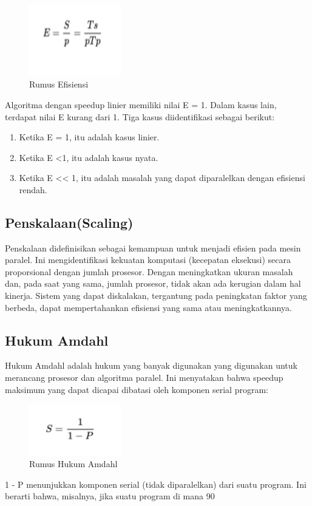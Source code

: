 \begin{figure}[H]
    \includegraphics[width=4cm]{figures/kelompok3/1/efisiensi.png}
    \centering
    \caption{Rumus Efisiensi}
\end{figure}
Algoritma dengan speedup linier memiliki nilai E = 1. Dalam kasus lain, terdapat nilai E kurang dari 1. 
\hfill\break
Tiga kasus diidentifikasi sebagai berikut:
\begin{enumerate}
	\item Ketika E = 1, itu adalah kasus linier.  
	\item Ketika E <1, itu adalah kasus nyata.  
	\item Ketika E << 1, itu adalah masalah yang dapat diparalelkan dengan efisiensi rendah.
\end{enumerate}
\subsection{Penskalaan(Scaling)}
Penskalaan didefinisikan sebagai kemampuan untuk menjadi efisien pada mesin paralel. Ini mengidentifikasi kekuatan komputasi (kecepatan eksekusi) secara proporsional dengan jumlah prosesor. Dengan meningkatkan ukuran masalah dan, pada saat yang sama, jumlah prosesor, tidak akan ada kerugian dalam hal kinerja. Sistem yang dapat diskalakan, tergantung pada peningkatan faktor yang berbeda, dapat mempertahankan efisiensi yang sama atau meningkatkannya.

\subsection{Hukum Amdahl}
Hukum Amdahl adalah hukum yang banyak digunakan yang digunakan untuk merancang prosesor dan algoritma paralel. Ini menyatakan bahwa speedup maksimum yang dapat dicapai dibatasi oleh komponen serial program:
\begin{figure}[H]
    \includegraphics[width=4cm]{figures/kelompok3/1/amdahl.png}
    \centering
    \caption{Rumus Hukum Amdahl}
\end{figure}
1 - P menunjukkan komponen serial (tidak diparalelkan) dari suatu program.
\hfill\break
Ini berarti bahwa, misalnya, jika suatu program di mana 90%

